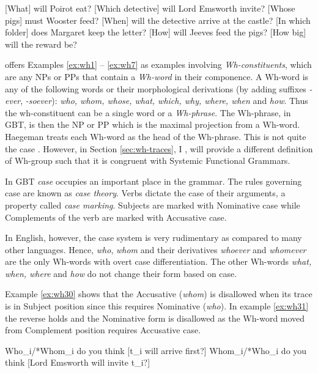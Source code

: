 \begin{exe}
	\ex\label{ex:wh1} [What] will Poirot eat?
	\ex\label{ex:wh2} [Which detective] will Lord Emsworth invite?
	\ex\label{ex:wh3} [Whose pigs] must Wooster feed?
	\ex\label{ex:wh4} [When] will the detective arrive at the castle?
	\ex\label{ex:wh5} [In which folder] does Margaret keep the letter?
	\ex\label{ex:wh6} [How] will Jeeves feed the pigs? 
	\ex\label{ex:wh7} [How big] will the reward be?
\end{exe}

    \citet[375]{Haegeman1991} offers Examples \ref{ex:wh1} -- \ref{ex:wh7} as examples involving \textit{Wh-constituents}, which are any NPs or PPs that contain a \textit{Wh-word} in their componence. A Wh-word is any of the following words or their morphological derivations (by adding suffixes \textit{-ever}, \textit{-soever}): \textit{who, whom, whose, what, which, why, where, when} and \textit{how}. Thus the wh-constituent can be a single word or a \textit{Wh-phrase}. The Wh-phrase, in GBT, is then the NP or PP which is the maximal projection from a Wh-word. Haegeman treats each Wh-word as the head of the Wh-phrase. This is not quite the case . However, in Section \ref{sec:wh-traces}, I , will provide a different definition of Wh-group such that it is congruent with Systemic Functional Grammars.

    In GBT \textit{case} occupies an important place in the grammar. The rules governing case are known as \textit{case theory}. Verbs dictate the case of their arguments, a property called \textit{case marking}. Subjects are marked with Nominative case while Complements of the verb are marked with Accusative case. 

    In English, however, the case system is very rudimentary as compared to many other languages. Hence, \textit{who}, \textit{whom} and their derivatives \textit{whoever} and \textit{whomever} are the only Wh-words with overt case differentiation. The other Wh-words \textit{what, when, where} and \textit{how} do not change their form based on case. 

    Example \ref{ex:wh30} shows that the Accusative (\textit{whom}) is disallowed when its trace is in Subject position since this requires Nominative (\textit{who}). In example \ref{ex:wh31} the reverse holds and the Nominative form is disallowed as the Wh-word moved from Complement position requires Accusative case. 

    \begin{exe}
    	\ex\label{ex:wh30} Who_{i}/*Whom_{i} do you think [t_{i} will arrive first?]
    	\ex\label{ex:wh31} Whom_{i}/*Who_{i} do you think [Lord Emsworth will invite t_{i}?]
    \end{exe}

